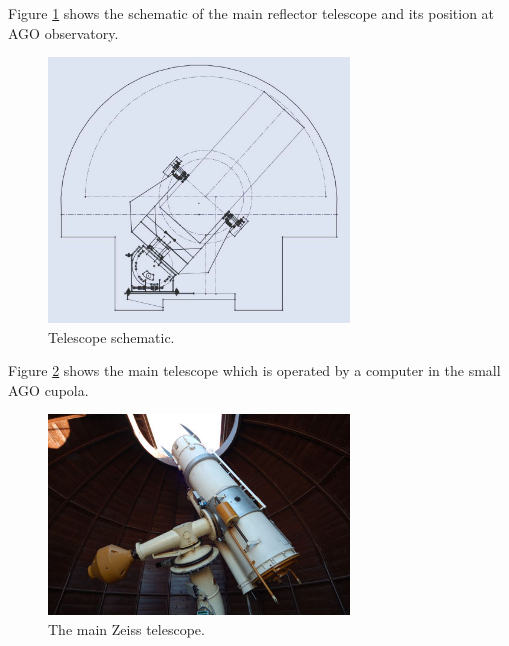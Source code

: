 	Figure \ref{fig:fmpiago1} shows the schematic of the main reflector telescope and its position at AGO observatory.
	
\begin{figure}[H]
  \centering
  \includegraphics[width=8cm]{images/FMPIAGO1}
  \caption{Telescope schematic.}
  \label{fig:fmpiago1}
\end{figure}

	Figure \ref{fig:fmpiago2} shows the main telescope which is operated by a computer in the small AGO cupola.

\begin{figure}[H]
\centering
  \includegraphics[width=8cm]{images/FMPIAGO2}
  \caption{The main Zeiss telescope.}
  \label{fig:fmpiago2}
\end{figure}